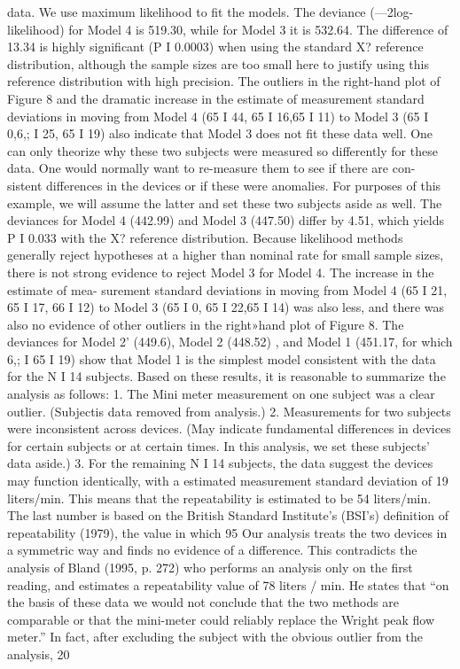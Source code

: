 data. We use maximum likelihood to ﬁt the models. The deviance (—2log-likelihood)
for Model 4 is 519.30, while for Model 3 it is 532.64. The difference of 13.34 is highly
signiﬁcant (P I 0.0003) when using the standard X? reference distribution, although
the sample sizes are too small here to justify using this reference distribution with
high precision. The outliers in the right-hand plot of Figure 8 and the dramatic
increase in the estimate of measurement standard deviations in moving from Model
4 (65 I 44, 65 I 16,65 I 11) to Model 3 (65 I 0,6,; I 25, 65 I 19) also indicate that
Model 3 does not ﬁt these data well.
One can only theorize why these two subjects were measured so differently for
these data. One would normally want to re-measure them to see if there are con-
sistent differences in the devices or if these were anomalies. For purposes of this
example, we will assume the latter and set these two subjects aside as well. The
deviances for Model 4 (442.99) and Model 3 (447.50) differ by 4.51, which yields
P I 0.033 with the X? reference distribution. Because likelihood methods generally
reject hypotheses at a higher than nominal rate for small sample sizes, there is not
strong evidence to reject Model 3 for Model 4. The increase in the estimate of mea-
surement standard deviations in moving from Model 4 (65 I 21, 65 I 17, 66 I 12) to
Model 3 (65 I 0, 65 I 22,65 I 14) was also less, and there was also no evidence of
other outliers in the right»hand plot of Figure 8.
The deviances for Model 2’ (449.6), Model 2 (448.52) , and Model 1 (451.17, for
which 6,; I 65 I 19) show that Model 1 is the simplest model consistent with the
data for the N I 14 subjects. Based on these results, it is reasonable to summarize
the analysis as follows:
1. The Mini meter measurement on one subject was a clear outlier. (Subjectis
data removed from analysis.)
2. Measurements for two subjects were inconsistent across devices. (May indicate
fundamental differences in devices for certain subjects or at certain times. In
this analysis, we set these subjects’ data aside.)
3. For the remaining N I 14 subjects, the data suggest the devices may function
identically, with a estimated measurement standard deviation of 19 liters/min.
This means that the repeatability is estimated to be 54 liters/min.
The last number is based on the British Standard Institute’s (BSI’s) deﬁnition of
repeatability (1979), the value in which 95%
Our analysis treats the two devices in a symmetric way and ﬁnds no evidence of
a difference. This contradicts the analysis of Bland (1995, p. 272) who performs an
analysis only on the first reading, and estimates a repeatability value of 78 liters / min.
He states that “on the basis of these data we would not conclude that the two methods
are comparable or that the mini-meter could reliably replace the Wright peak flow
meter.” In fact, after excluding the subject with the obvious outlier from the analysis,
20




